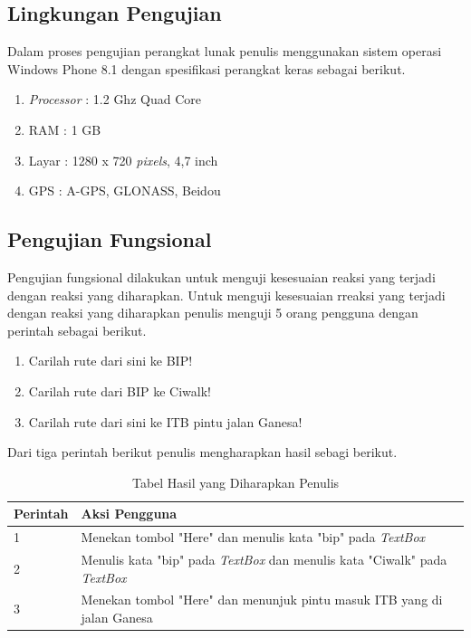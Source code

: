 \subsection{Lingkungan Pengujian}
\label{lab:Lingkungan Pengujian}
\hspace{0.5cm} Dalam proses pengujian perangkat lunak penulis menggunakan sistem operasi Windows Phone 8.1 dengan spesifikasi perangkat keras sebagai berikut.
\begin{enumerate}
	\item \textit{Processor} : 1.2 Ghz Quad Core
	\item RAM : 1 GB
	\item Layar : 1280 x 720 \textit{pixels}, 4,7 inch
	\item GPS : A-GPS, GLONASS, Beidou
\end{enumerate}

\subsection{Pengujian Fungsional}
\label{lab:Pengujian Fungsional}
\hspace{0.5cm} Pengujian fungsional dilakukan untuk menguji kesesuaian reaksi yang terjadi dengan reaksi yang diharapkan. Untuk menguji kesesuaian rreaksi yang terjadi dengan reaksi yang diharapkan penulis menguji 5 orang pengguna dengan perintah sebagai berikut. 
\begin{enumerate}
	\item Carilah rute dari sini ke BIP!
	\item Carilah rute dari BIP ke Ciwalk!
	\item Carilah rute dari sini ke ITB pintu jalan Ganesa!
\end{enumerate}

Dari tiga perintah berikut penulis mengharapkan hasil sebagi berikut.
\begin{table}[h]
	\centering
		\begin{tabular}{|p{2cm}|p{10cm}|}\hline
				Perintah & Aksi Pengguna \\ \hline
				1 & Menekan tombol "Here" dan menulis kata "bip" pada \textit{TextBox} \\ \hline
				2 & Menulis kata "bip" pada \textit{TextBox} dan menulis kata "Ciwalk" pada \textit{TextBox} \\ \hline
				3 & Menekan tombol "Here" dan menunjuk pintu masuk ITB yang di jalan Ganesa \\ \hline
		\end{tabular}
	\caption{Tabel Hasil yang Diharapkan Penulis}
	\label{tab:TabelHasilyangdiharapkanPenulis}
\end{table}

